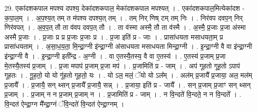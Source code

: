 \documentclass[17pt]{extarticle}
\begin{document}
29. एका॑दशकपाल मपश्य दपश्य॒ देका॑दशकपाल॒ मेका॑दशकपाल मपश्यत् । . एका॑दशकपाल॒मित्येका॑दश - क॒पा॒ल॒म् । . अ॒प॒श्य॒त् तम् त म॑पश्य दपश्य॒त् तम् । . तम् निर् णिष् टम् तम् निः । . निर॑वप दवप॒न् निर् णिर॑वपत् । . अ॒व॒प॒त् तौ ता व॑वप दवप॒त् तौ । . ता व॑स्मा अस्मै॒ तौ ता व॑स्मै । . अ॒स्मै॒ प्र॒जाः प्र॒जा अ॑स्मा अस्मै प्र॒जाः । . प्र॒जाः प्र प्र प्र॒जाः प्र॒जाः प्र । . प्र॒जा इति॑ प्र - जाः । . प्रासा॑धयता मसाधयता॒म् प्र प्रासा॑धयताम् । . अ॒सा॒ध॒य॒ता॒ मि॒न्द्रा॒ग्नी इ॑न्द्रा॒ग्नी अ॑साधयता मसाधयता मिन्द्रा॒ग्नी । . इ॒न्द्रा॒ग्नी वै वा इ॑न्द्रा॒ग्नी इ॑न्द्रा॒ग्नी वै । . इ॒न्द्रा॒ग्नी इती᳚न्द्र - अ॒ग्नी । . वा ए॒तस्यै॒तस्य॒ वै वा ए॒तस्य॑ । . ए॒तस्य॑ प्र॒जाम् प्र॒जा मे॒तस्यै॒तस्य॑ प्र॒जाम् । . प्र॒जा मपाप॑ प्र॒जाम् प्र॒जा मप॑ । . प्र॒जामिति॑ प्र - जाम् । . अप॑ गूहतो गूह॒तो ऽपाप॑ गूहतः । . गू॒ह॒तो॒ यो यो गू॑हतो गूहतो॒ यः । . यो ऽल॒ मलं॒ ॅयो यो ऽल᳚म् । . अल॑म् प्र॒जायै᳚ प्र॒जाया॒ अल॒ मल॑म् प्र॒जायै᳚ । . प्र॒जायै॒ सन् थ्सन् प्र॒जायै᳚ प्र॒जायै॒ सन्न् । . प्र॒जाया॒ इति॑ प्र - जायै᳚ । . सन् प्र॒जाम् प्र॒जाꣳ सन् थ्सन् प्र॒जाम् । . प्र॒जाम् न न प्र॒जाम् प्र॒जाम् न । . प्र॒जामिति॑ प्र - जाम् । . न वि॒न्दते॑ वि॒न्दते॒ न न वि॒न्दते᳚ । . वि॒न्दत॑ ऐन्द्रा॒ग्न मै᳚न्द्रा॒ग्नं ॅवि॒न्दते॑ वि॒न्दत॑ ऐन्द्रा॒ग्नम् । \newline
\end{document}
